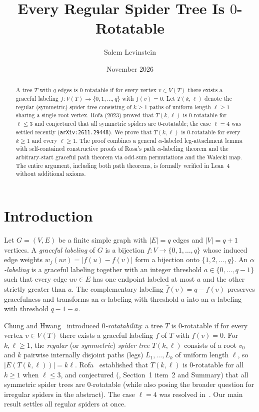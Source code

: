 \documentclass[11pt]{article}
\title{Every Regular Spider Tree Is $0$-Rotatable}
\author{Salem Levinstein}
\date{November 2026}
\begin{document}
\maketitle

\begin{abstract}
A tree $T$ with $q$ edges is $0$-rotatable if for every vertex $v \in V(T)$ there exists a graceful labeling $f : V(T) \to \{0, 1, \dots, q\}$ with $f(v) = 0$. Let $T(k, \ell)$ denote the regular (symmetric) spider tree consisting of $k \ge 1$ paths of uniform length $\ell \ge 1$ sharing a single root vertex. Rofa (2023) proved that $T(k, \ell)$ is $0$-rotatable for $\ell \le 3$ and conjectured that all symmetric spiders are $0$-rotatable; the case $\ell = 4$ was settled recently (\texttt{arXiv:2611.29448}). We prove that $T(k, \ell)$ is $0$-rotatable for every $k \ge 1$ and every $\ell \ge 1$. The proof combines a general $\alpha$-labeled leg-attachment lemma with self-contained constructive proofs of Rosa's path $\alpha$-labeling theorem and the arbitrary-start graceful path theorem via odd-sum permutations and the Walecki map. The entire argument, including both path theorems, is formally verified in Lean~4 without additional axioms.
\end{abstract}

\section{Introduction}

Let $G = (V, E)$ be a finite simple graph with $|E| = q$ edges and $|V| = q + 1$ vertices. A \emph{graceful labeling} of $G$ is a bijection $f : V \to \{0, 1, \dots, q\}$ whose induced edge weights $w_f(uv) = |f(u) - f(v)|$ form a bijection onto $\{1, 2, \dots, q\}$. An \emph{$\alpha$-labeling} is a graceful labeling together with an integer threshold $a \in \{0, \dots, q - 1\}$ such that every edge $uv \in E$ has one endpoint labeled at most $a$ and the other strictly greater than $a$. The complementary labeling $\bar{f}(v) = q - f(v)$ preserves gracefulness and transforms an $\alpha$-labeling with threshold $a$ into an $\alpha$-labeling with threshold $q - 1 - a$.

Chung and Hwang~\cite{ChungHwang1981} introduced \emph{$0$-rotatability}: a tree $T$ is $0$-rotatable if for every vertex $v \in V(T)$ there exists a graceful labeling $f$ of $T$ with $f(v) = 0$. For $k, \ell \ge 1$, the \emph{regular} (or \emph{symmetric}) \emph{spider tree} $T(k, \ell)$ consists of a root $v_0$ and $k$ pairwise internally disjoint paths (legs) $L_1, \dots, L_k$ of uniform length $\ell$, so $|E(T(k, \ell))| = k\ell$. Rofa~\cite{Rofa2023} established that $T(k, \ell)$ is $0$-rotatable for all $k \ge 1$ when $\ell \le 3$, and conjectured (\cite{Rofa2023}, Section~1 item~2 and Summary) that all symmetric spider trees are $0$-rotatable (while also posing the broader question for irregular spiders in the abstract). The case $\ell = 4$ was resolved in~\cite{SpiderL4}. Our main result settles all regular spiders at once.
\end{document}

